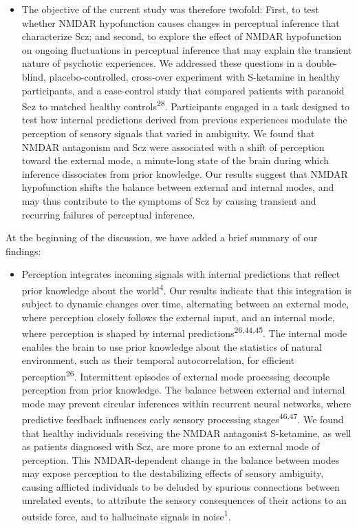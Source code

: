 \documentclass[
]{article}
\providecommand{\tightlist}{%
  \setlength{\itemsep}{0pt}\setlength{\parskip}{0pt}}
\begin{document}
\begin{itemize}
\tightlist
\item
  The objective of the current study was therefore twofold: First, to
  test whether NMDAR hypofunction causes changes in perceptual inference
  that characterize Scz; and second, to explore the effect of NMDAR
  hypofunction on ongoing fluctuations in perceptual inference that may
  explain the transient nature of psychotic experiences. We addressed
  these questions in a double-blind, placebo-controlled, cross-over
  experiment with S-ketamine in healthy participants, and a case-control
  study that compared patients with paranoid Scz to matched healthy
  controls\textsuperscript{28}. Participants engaged in a task designed
  to test how internal predictions derived from previous experiences
  modulate the perception of sensory signals that varied in ambiguity.
  We found that NMDAR antagonism and Scz were associated with a shift of
  perception toward the external mode, a minute-long state of the brain
  during which inference dissociates from prior knowledge. Our results
  suggest that NMDAR hypofunction shifts the balance between external
  and internal modes, and may thus contribute to the symptoms of Scz by
  causing transient and recurring failures of perceptual inference.
\end{itemize}

At the beginning of the discussion, we have added a brief summary of our
findings:

\begin{itemize}
\tightlist
\item
  Perception integrates incoming signals with internal predictions that
  reflect prior knowledge about the world\textsuperscript{4}. Our
  results indicate that this integration is subject to dynamic changes
  over time, alternating between an external mode, where perception
  closely follows the external input, and an internal mode, where
  perception is shaped by internal
  predictions\textsuperscript{26,44,45}. The internal mode enables the
  brain to use prior knowledge about the statistics of natural
  environment, such as their temporal autocorrelation, for efficient
  perception\textsuperscript{26}. Intermittent episodes of external mode
  processing decouple perception from prior knowledge. The balance
  between external and internal mode may prevent circular inferences
  within recurrent neural networks, where predictive feedback influences
  early sensory processing stages\textsuperscript{46,47}. We found that
  healthy individuals receiving the NMDAR antagonist S-ketamine, as well
  as patients diagnosed with Scz, are more prone to an external mode of
  perception. This NMDAR-dependent change in the balance between modes
  may expose perception to the destabilizing effects of sensory
  ambiguity, causing afflicted individuals to be deluded by spurious
  connections between unrelated events, to attribute the sensory
  consequences of their actions to an outside force, and to hallucinate
  signals in noise\textsuperscript{1}.
\end{itemize}
\end{document}
